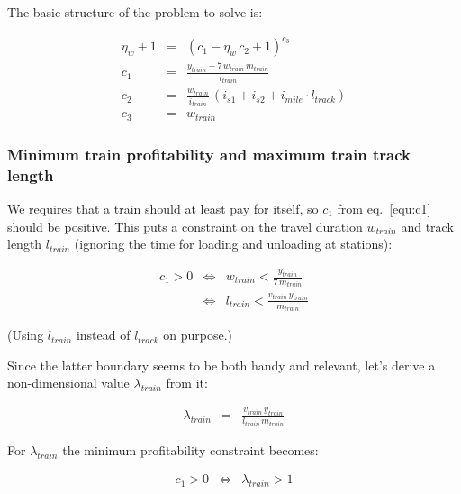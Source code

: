 \documentclass[12pt]{article}
\begin{document}
The basic structure of the problem to solve is:

\begin{eqnarray}
\eta_w + 1  
  &=& 
    \left( 
      c_1 - \eta_w \, c_2 + 1 
    \right) ^{c_3} \label{equ:eta_w_1} \\
c_1 &=& \frac{y_\mathit{train} - 7 \, w_\mathit{train} \, m_\mathit{train}}{i_\mathit{train}} \label{equ:c1} \\
c_2 &=& \frac{w_\mathit{train}}{i_\mathit{train}} \, \left( 
          i_\mathit{s1} + i_\mathit{s2} 
          + i_\mathit{mile} \cdot l_\mathit{track}
        \right) \\
c_3 &=& w_\mathit{train}
\end{eqnarray}

\subsubsection{Minimum train profitability and maximum train track length}

We requires that a train should at least pay for itself, so $c_1$ from eq.~\ref{equ:c1} should be positive. This puts a constraint on the travel duration $w_\mathit{train}$ and track length $l_\mathit{train}$ (ignoring the time for loading and unloading at stations):

\begin{eqnarray}
  c_1 > 0 
& \Longleftrightarrow &
  w_\mathit{train} < \frac{y_\mathit{train}}{7 \, m_\mathit{train}} \\
& \Longleftrightarrow &
  l_\mathit{train} < \frac{v_\mathit{train} \, y_\mathit{train}}{m_\mathit{train}}
\end{eqnarray}

(Using $l_\mathit{train}$ instead of $l_\mathit{track}$ on purpose.)

Since the latter boundary seems to be both handy and relevant, let's derive a non-dimensional value $\lambda_\mathit{train}$ from it:

\begin{eqnarray}
  \lambda_\mathit{train} &=& \frac{v_\mathit{train} \, y_\mathit{train}}{l_\mathit{train} \, m_\mathit{train} }
\end{eqnarray}

For $\lambda_\mathit{train}$ the minimum profitability constraint becomes:

\begin{eqnarray}
  c_1 > 0 & \Longleftrightarrow & \lambda_\mathit{train} > 1  
\end{eqnarray}
\end{document}
